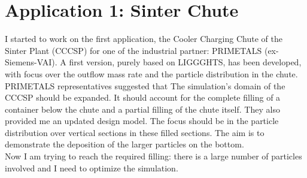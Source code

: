 
\section{Application 1: Sinter Chute}
\label{sec:application1sinterchute}

I started to work on the first application, the Cooler Charging Chute of the
Sinter Plant (CCCSP) for one of the industrial partner: PRIMETALS
(ex-Siemens-VAI).
A first version, purely
based on LIGGGHTS, has been developed, with focus over the outflow mass rate 
and the particle distribution in the chute.
PRIMETALS representatives suggested that The simulation’s domain of the CCCSP
should be expanded. It should account for the complete filling of a container 
below the chute and a partial filling of the chute itself.
They also provided me an updated design model.
The focus should be in the particle distribution over vertical sections in these
filled sections. The aim is to demonstrate the deposition of the larger
particles on the bottom.\\
Now I am trying to reach the required filling: there is a large number of
particles involved and I need to optimize the simulation.



